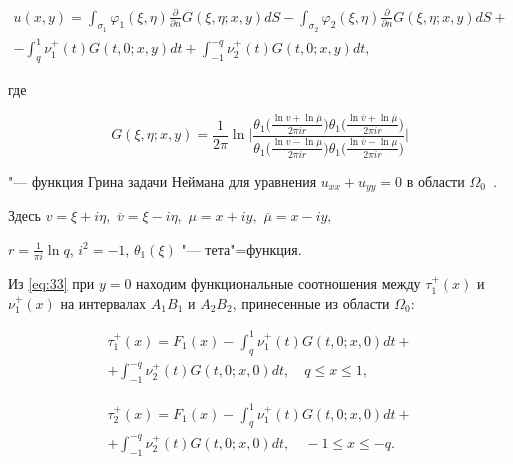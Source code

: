\begin{multline}

u(x,y) =  \int _{{\sigma _1}} {{\varphi _1}(\xi ,\eta )\frac{\partial }{{\partial n}}G(\xi ,\eta ;x,y)dS}  -  \int _{{\sigma _2}} {{\varphi _2}(\xi ,\eta )\frac{\partial }{{\partial n}}G(\xi ,\eta ;x,y)dS}  + 

\\

 -  \int _q^1 {\nu _1^ + (t)G(t, 0; x, y)dt}  +  \int _{ - 1}^{ - q} \nu _2^ + (t)G(t, 0;x,y)dt, 

 \label{eq:33}

\end{multline}

где 

\begin{equation}

G(\xi ,\eta ;x,y) = \frac{1}{{2\pi }}\ln 

\biggl| {\frac{{{\theta _1}\bigl( {\frac{{\ln v + \ln \overline \mu  }}{{2\pi ir}}} \bigr){\theta _1}\bigl( {\frac{{\ln \overline v  + \ln \overline \mu  }}{{2\pi ir}}} \bigr)}}{{{\theta _1}\bigl( {\frac{{\ln v - \ln \mu }}{{2\pi ir}}} \bigr){\theta _1}\bigl( {\frac{{\ln \overline v  - \ln \mu }}{{2\pi ir}}} \bigr)}}} \biggr| \label{eq:34}

\end{equation}

"--- функция Грина задачи Неймана для уравнения ${u_{xx}} + {u_{yy}} = 0$  в области ${\Omega _0}$~\cite{Islabd:bib:Islomabdul}.

Здесь  $v = \xi  + i\eta ,$ $ \overline v  = \xi  - i\eta ,$ $\mu  = x + iy,$ $\overline \mu   = x - iy,$

$r = \frac{1}{{\pi i}}\ln q$, ${i^2} =  - 1$, ${\theta _1}(\xi ) $ "--- тета"=функция.

Из  \eqref{eq:33} при $y = 0$ находим функциональные соотношения между  $\tau _1^ + (x)$ и $\nu _1^ + (x)$   на интервалах ${A_1}{B_1}$ и ${{A_2}{B_2}} $, принесенные из области ${\Omega _0}$:

\begin{multline}

\tau _1^ + (x) = {F_1}(x) -  \int _q^1 {\nu _1^ + (t)G(t, 0; x, 0)dt}  +  \\

+ \int _{ - 1}^{ - q} {\nu _2^ + (t)G(t, 0; x, 0)dt}, \quad   q \le x \le 1, \label{eq:35.1}

\end{multline}

\begin{multline}

\tau _2^ + (x) = {F_1}(x) -  \int _q^1 {\nu _1^ + (t)G(t, 0; x, 0)dt}  +  \\ 

+ \int _{ - 1}^{ - q} {\nu _2^ + (t)G(t, 0; x, 0)dt},\quad   - 1 \le x \le  - q. \label{eq:35.2} 

\end{multline}

